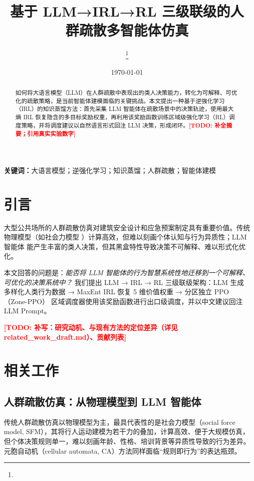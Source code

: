 \documentclass[UTF8,zihao=-4]{ctexart}
\title{基于 LLM→IRL→RL 三级联级的人群疏散多智能体仿真}
\author{\todo{作者姓名}\thanks{\todo{单位、邮箱}}}
\date{\today}
\newcommand{\todo}[1]{\textcolor{red}{\textbf{[TODO: #1]}}}
\begin{document}
\maketitle

\begin{abstract}
如何将大语言模型（LLM）在人群疏散中表现出的类人决策能力，转化为可解释、可优化的疏散策略，是当前智能体建模面临的关键挑战。本文提出一种基于逆强化学习（IRL）的知识蒸馏方法：首先采集 LLM 智能体在疏散场景中的决策轨迹，使用最大熵 IRL 恢复隐含的多目标奖励权重，再利用该奖励函数训练区域级强化学习（RL）调度策略，并将调度建议以自然语言形式回注 LLM 决策，形成闭环。\todo{补全摘要；引用真实实验数字}
\end{abstract}

\noindent\textbf{关键词：}大语言模型；逆强化学习；知识蒸馏；人群疏散；智能体建模

\section{引言}

大型公共场所的人群疏散仿真对建筑安全设计和应急预案制定具有重要价值。传统物理模型（如社会力模型 \cite{helbing1995social}）计算高效，但难以刻画个体认知与行为异质性；LLM 智能体 \cite{wu2023sabm} 能产生丰富的类人决策，但其黑盒特性导致决策不可解释、难以形式化优化。

本文回答的问题是：\emph{能否将 LLM 智能体的行为智慧系统性地迁移到一个可解释、可优化的决策系统中？} 我们提出 LLM → IRL → RL 三级联级架构：LLM 生成多样化人类行为数据 → MaxEnt IRL 恢复 5 维价值权重 \cite{ziebart2008maxent} → 分区独立 PPO（Zone-PPO） 区域调度器使用该奖励函数进行出口级调度，并以中文建议回注 LLM Prompt。

\todo{补写：研究动机、与现有方法的定位差异（详见 related_work_draft.md）、贡献列表}

\section{相关工作}


\subsection{人群疏散仿真：从物理模型到 LLM 智能体}

传统人群疏散仿真以物理模型为主，最具代表性的是社会力模型（social force model, SFM）\cite{helbing1995social}，其将行人运动建模为若干力的叠加，计算高效、便于大规模仿真，但个体决策规则单一，难以刻画年龄、性格、培训背景等异质性导致的行为差异。元胞自动机（cellular automata, CA）方法同样面临“规则即行为”的表达瓶颈。
\end{document}
